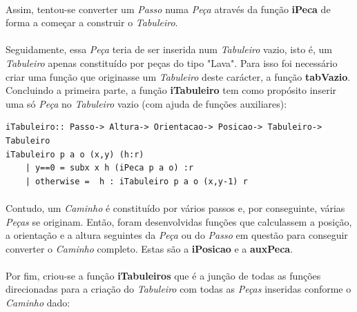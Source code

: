 \documentclass[12pt,a4paper]{report}
\begin{document}
\paragraph{} 
\paragraph{}Assim, tentou-se converter um \textit{Passo} numa \textit{Peça} através da função \textbf{iPeca} de forma a começar a construir o \textit{Tabuleiro}.
\paragraph{}Seguidamente, essa \textit{Peça} teria de ser inserida num \textit{Tabuleiro} vazio, isto é, um \textit{Tabuleiro} apenas constituído por peças do tipo "Lava". 
\newline Para isso foi necessário criar uma função que originasse um \textit{Tabuleiro} deste carácter, a função \textbf{tabVazio}. 
\newline Concluindo a primeira parte, a função \textbf{iTabuleiro} tem como propósito inserir uma só \textit{Peça} no \textit{Tabuleiro} vazio (com ajuda de funções auxiliares):


\begin{verbatim}
iTabuleiro:: Passo-> Altura-> Orientacao-> Posicao-> Tabuleiro-> Tabuleiro 
iTabuleiro p a o (x,y) (h:r) 
    | y==0 = subx x h (iPeca p a o) :r
    | otherwise =  h : iTabuleiro p a o (x,y-1) r
\end{verbatim}


\paragraph{}Contudo, um \textit{Caminho} é constituído por vários passos e, por conseguinte, várias \textit{Peças} se originam. Então, foram desenvolvidas funções que calculassem a posição, a orientação e a altura seguintes da \textit{Peça} ou do \textit{Passo} em questão para conseguir converter o \textit{Caminho} completo. Estas são a \textbf{iPosicao} e a \textbf{auxPeca}. 

\paragraph{}Por fim, criou-se a função \textbf{iTabuleiros} que é a junção de todas as funções direcionadas para a criação do \textit{Tabuleiro} com todas as \textit{Peças} inseridas conforme o \textit{Caminho} dado:
\end{document}
